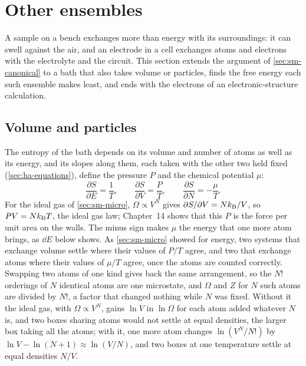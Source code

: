 \section{Other ensembles}
\label{sec:sm-other}

A sample on a bench exchanges more than energy with its surroundings: it
can swell against the air, and an electrode in a cell exchanges atoms and
electrons with the electrolyte and the circuit. This section extends the
argument of \cref{sec:sm-canonical} to a bath that also takes volume or
particles, finds the free energy each such ensemble makes least, and ends
with the electrons of an electronic-structure calculation.

\subsection*{Volume and particles}

The entropy of the bath depends on its volume and number of atoms as well
as its energy, and its slopes along them, each taken with the other two
held fixed (\cref{sec:ha-equations}), define the pressure $P$ and the
chemical potential $\mu$:
\begin{equation*}
   \frac{\partial S}{\partial E} = \frac1T , \qquad
   \frac{\partial S}{\partial V} = \frac PT , \qquad
   \frac{\partial S}{\partial N} = -\frac\mu T .
\end{equation*}
For the ideal gas of \cref{sec:sm-micro}, $\Omega \propto V^N$ gives
$\partial S/\partial V = Nk_{\mathrm{B}}/V$, so $PV = Nk_{\mathrm{B}} T$, the ideal gas law;
Chapter~14 shows that this $P$ is the force per unit area on the walls.
The minus sign makes $\mu$ the energy that one more atom brings, as $\dd
E$ below shows. As \cref{sec:sm-micro} showed for energy, two systems that
exchange volume settle where their values of $P/T$ agree, and two that
exchange atoms where their values of $\mu/T$ agree, once the atoms are
counted correctly. Swapping two atoms of one kind gives back the same
arrangement, so the $N!$ orderings of $N$ identical atoms are one
microstate, and $\Omega$ and $Z$ for $N$ such atoms are divided by $N!$, a
factor that changed nothing while $N$ was fixed. Without it the ideal gas,
with $\Omega \propto V^N$, gains $\ln V$ in $\ln\Omega$ for each atom
added whatever $N$ is, and two boxes sharing atoms would not settle at
equal densities, the larger box taking all the atoms;
with it, one more atom changes $\ln(V^N/N!)$ by $\ln V - \ln(N + 1)
\approx \ln(V/N)$, and two boxes at one temperature settle at equal
densities $N/V$.

